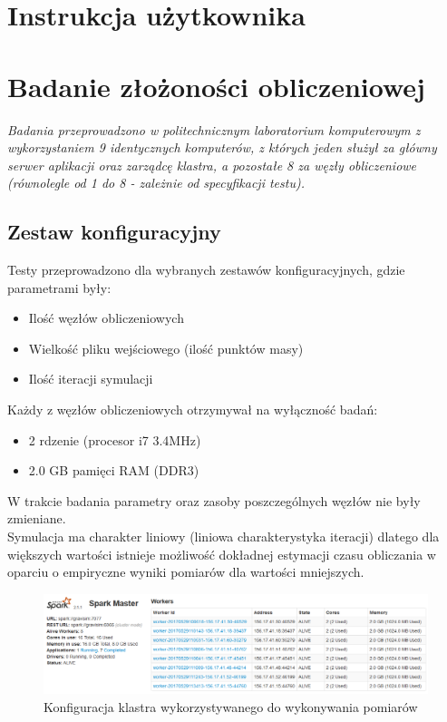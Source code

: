 \documentclass[a4paper,onecolumn,oneside,12pt]{memoir}
\begin{document}
{{\chapter{Instrukcja użytkownika}


\chapter{Badanie złożoności obliczeniowej}
\emph{Badania przeprowadzono w politechnicznym laboratorium komputerowym z wykorzystaniem 9 identycznych komputerów, z których jeden służył za główny serwer aplikacji oraz zarządcę klastra, a pozostałe 8 za węzły obliczeniowe (równolegle od 1 do 8 - zależnie od specyfikacji testu).}

\section{Zestaw konfiguracyjny}

Testy przeprowadzono dla wybranych zestawów konfiguracyjnych, gdzie parametrami były:
\begin{itemize}
\item Ilość węzłów obliczeniowych
\item Wielkość pliku wejściowego (ilość punktów masy)
\item Ilość iteracji symulacji
\end{itemize}
Każdy z węzłów obliczeniowych otrzymywał na wyłączność badań:
\begin{itemize}
\item 2 rdzenie (procesor i7 3.4MHz)
\item 2.0 GB pamięci RAM (DDR3)
\end{itemize}
W trakcie badania parametry oraz zasoby poszczególnych węzłów nie były zmieniane.\\
Symulacja ma charakter liniowy (liniowa charakterystyka iteracji) dlatego dla większych wartości istnieje możliwość dokładnej estymacji czasu obliczania w oparciu o empiryczne wyniki pomiarów dla wartości mniejszych.

\begin{figure}[h!]
	\centering
	\includegraphics[width=1\linewidth]{klaster}
	\caption{Konfiguracja klastra wykorzystywanego do wykonywania pomiarów}
	\label{fig:stronaTytulowa}
\end{figure}

}}
\end{document}
